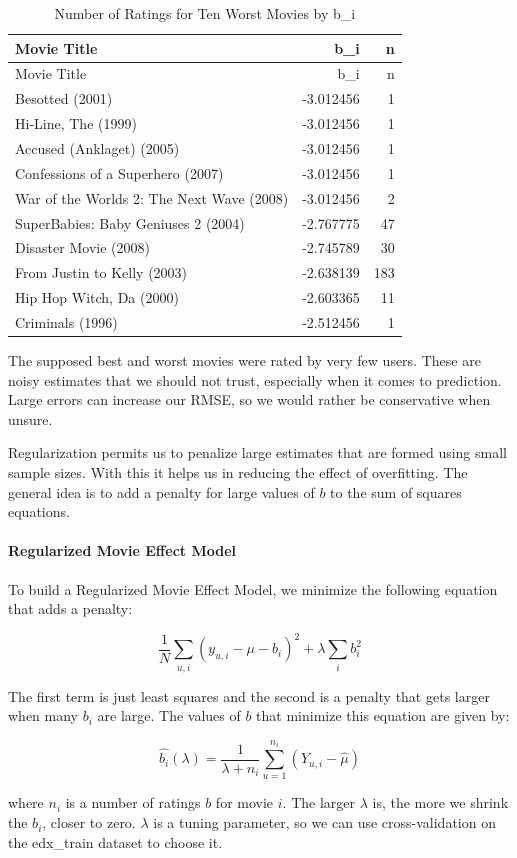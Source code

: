 \documentclass[
]{article}
\let\oldparagraph\paragraph
\renewcommand{\paragraph}[1]{\oldparagraph{#1}\mbox{}}
\begin{document}
\begin{longtable}[]{@{}lrr@{}}
\caption{Number of Ratings for Ten Worst Movies by b\_i}\tabularnewline
\toprule
Movie Title & b\_i & n\tabularnewline
\midrule
\endfirsthead
\toprule
Movie Title & b\_i & n\tabularnewline
\midrule
\endhead
Besotted (2001) & -3.012456 & 1\tabularnewline
Hi-Line, The (1999) & -3.012456 & 1\tabularnewline
Accused (Anklaget) (2005) & -3.012456 & 1\tabularnewline
Confessions of a Superhero (2007) & -3.012456 & 1\tabularnewline
War of the Worlds 2: The Next Wave (2008) & -3.012456 & 2\tabularnewline
SuperBabies: Baby Geniuses 2 (2004) & -2.767775 & 47\tabularnewline
Disaster Movie (2008) & -2.745789 & 30\tabularnewline
From Justin to Kelly (2003) & -2.638139 & 183\tabularnewline
Hip Hop Witch, Da (2000) & -2.603365 & 11\tabularnewline
Criminals (1996) & -2.512456 & 1\tabularnewline
\bottomrule
\end{longtable}

The supposed best and worst movies were rated by very few users. These
are noisy estimates that we should not trust, especially when it comes
to prediction. Large errors can increase our RMSE, so we would rather be
conservative when unsure.

Regularization permits us to penalize large estimates that are formed
using small sample sizes. With this it helps us in reducing the effect
of overfitting. The general idea is to add a penalty for large values of
\(b\) to the sum of squares equations.

\hypertarget{regularized-movie-effect-model}{%
\paragraph{Regularized Movie Effect
Model}\label{regularized-movie-effect-model}}

To build a Regularized Movie Effect Model, we minimize the following
equation that adds a penalty:

\[\frac{1}{N} \sum_{u,i} (y_{u,i} - \mu - b_{i})^{2} + \lambda \sum_{i} b_{i}^2\]

The first term is just least squares and the second is a penalty that
gets larger when many \(b_i\) are large. The values of \(b\) that
minimize this equation are given by:

\[\hat{b_{i}} (\lambda) = \frac{1}{\lambda + n_{i}} \sum_{u=1}^{n_{i}} (Y_{u,i} - \hat{\mu}) \]

where \(n_i\) is a number of ratings \(b\) for movie \(i\). The larger
\(\lambda\) is, the more we shrink the \(b_i\), closer to zero.
\(\lambda\) is a tuning parameter, so we can use cross-validation on the
edx\_train dataset to choose it.
\end{document}
